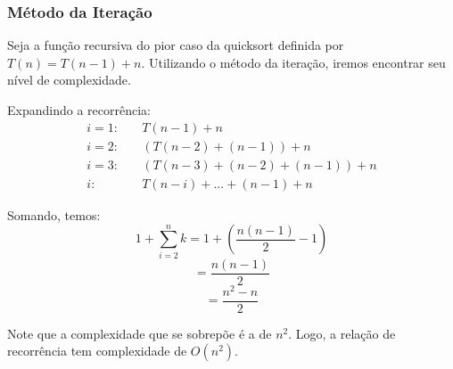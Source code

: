 \subsubsection{Método da Iteração}
Seja a função recursiva do pior caso da quicksort definida por \( T(n) = T(n-1) + n \). Utilizando o método da iteração, iremos encontrar seu nível de complexidade. 

Expandindo a recorrência: 
\begin{align*}
i = 1: & \quad T(n - 1) + n \\
i = 2: & \quad (T(n - 2) + (n - 1)) + n \\
i = 3: & \quad (T(n - 3) + (n - 2) + (n - 1)) + n \\
i: & \quad T(n - i) + ... + (n - 1) + n
\end{align*}

Somando, temos:
\[
1 + \sum_{i=2}^{n} k = 1 + \left( \frac{n(n-1)}{2} - 1 \right)
\]
\[
= \frac{n(n-1)}{2}
\]
\[
= \frac{n^2 - n}{2}
\]

Note que a complexidade que se sobrepõe é a de \( n^2 \). Logo, a relação de recorrência tem complexidade de \( O(n^2) \).
